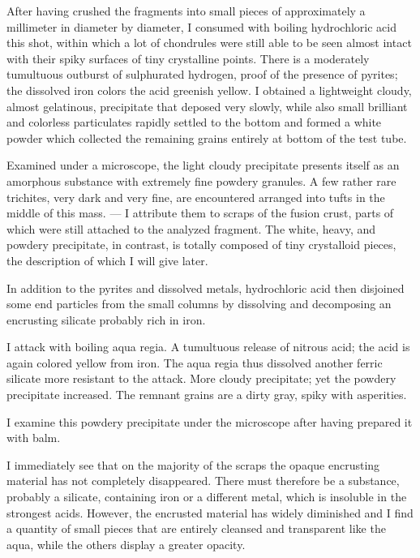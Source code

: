 \documentclass[a4paper, 12pt, oneside]{article}
\begin{document}
After having crushed the fragments into small pieces of approximately a millimeter in diameter by diameter, I consumed with boiling hydrochloric acid this shot, within which a lot of chondrules were still able to be seen almost intact with their spiky surfaces of tiny crystalline points. There is a moderately tumultuous outburst of sulphurated hydrogen, proof of the presence of pyrites; the dissolved iron colors the acid greenish yellow. I obtained a lightweight cloudy, almost gelatinous, precipitate that deposed very slowly, while also small brilliant and colorless particulates rapidly settled to the bottom and formed a white powder which collected the remaining grains entirely at bottom of the test tube.

Examined under a microscope, the light cloudy precipitate presents itself as an amorphous substance with extremely fine powdery granules. A few rather rare trichites, very dark and very fine, are encountered arranged into tufts in the middle of this mass. --- I attribute them to scraps of the fusion crust, parts of which were still attached to the analyzed fragment. The white, heavy, and powdery precipitate, in contrast, is totally composed of tiny crystalloid pieces, the description of which I will give later.

In addition to the pyrites and dissolved metals, hydrochloric acid then disjoined some end particles from the small columns by dissolving and decomposing an encrusting silicate probably rich in iron.

I attack with boiling aqua regia. A tumultuous release of nitrous acid; the acid is again colored yellow from iron. The aqua regia thus dissolved another ferric silicate more resistant to the attack. More cloudy precipitate; yet the powdery precipitate increased. The remnant grains are a dirty gray, spiky with asperities.

I examine this powdery precipitate under the microscope after having prepared it with balm.

I immediately see that on the majority of the scraps the opaque encrusting material has not completely disappeared. There must therefore be a substance, probably a silicate, containing iron or a different metal, which is insoluble in the strongest acids. However, the encrusted material has widely diminished and I find a quantity of small pieces that are entirely cleansed and transparent like the aqua, while the others display a greater opacity.
\end{document}
